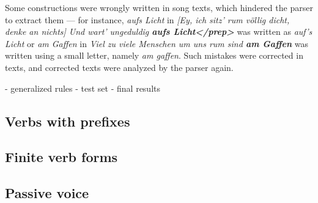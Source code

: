 Some constructions were wrongly written in song texts, which hindered the parser to extract them --- for instance, \textit{aufs Licht} in \textit{[Ey, ich sitz' rum völlig dicht, denke an nichts] Und wart' ungeduldig \textbf{aufs Licht</prep>}} was written as \textit{auf's Licht} or \textit{am Gaffen} in \textit{Viel zu viele Menschen um uns rum sind \textbf{am Gaffen}} was written using a small letter, namely \textit{am gaffen}. Such mistakes were corrected in texts, and corrected texts were analyzed by the parser again.

- generalized rules
- test set
- final results

\subsection{Verbs with prefixes}

\subsection{Finite verb forms}

\subsection{Passive voice}